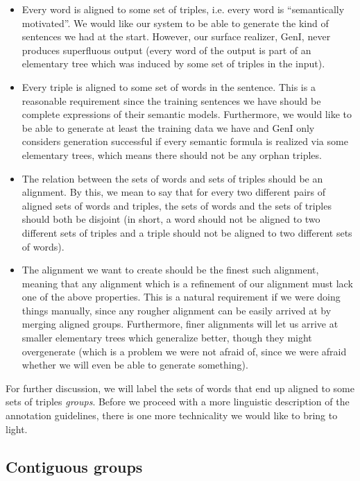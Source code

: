 \documentclass[a4paper]{article}
\begin{document}
\begin{itemize}
\item Every word is aligned to some set of triples, i.e. every word is
  ``semantically motivated''. We would like our system to be able to
  generate the kind of sentences we had at the start. However, our
  surface realizer, GenI, never produces superfluous output (every
  word of the output is part of an elementary tree which was induced
  by some set of triples in the input).
\item Every triple is aligned to some set of words in the sentence.
  This is a reasonable requirement since the training sentences we
  have should be complete expressions of their semantic models.
  Furthermore, we would like to be able to generate at least the
  training data we have and GenI only considers generation successful
  if every semantic formula is realized via some elementary trees,
  which means there should not be any orphan triples.
\item The relation between the sets of words and sets of triples
  should be an alignment. By this, we mean to say that for every two
  different pairs of aligned sets of words and triples, the sets of
  words and the sets of triples should both be disjoint (in short, a
  word should not be aligned to two different sets of triples and a
  triple should not be aligned to two different sets of words).
\item The alignment we want to create should be the finest such
  alignment, meaning that any alignment which is a refinement of our
  alignment must lack one of the above properties. This is a natural
  requirement if we were doing things manually, since any rougher
  alignment can be easily arrived at by merging aligned groups.
  Furthermore, finer alignments will let us arrive at smaller
  elementary trees which generalize better, though they might
  overgenerate (which is a problem we were not afraid of, since we
  were afraid whether we will even be able to generate something).
\end{itemize}

For further discussion, we will label the sets of words that end up
aligned to some sets of triples \emph{groups}. Before we proceed with
a more linguistic description of the annotation guidelines, there is
one more technicality we would like to bring to light.

\subsection{Contiguous groups}
\end{document}

